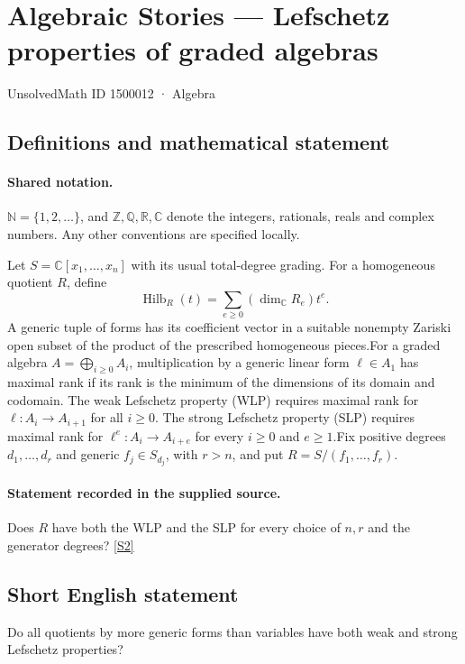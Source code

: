 \documentclass[11pt]{article}
\newcommand{\sref}[2]{\hyperlink{source:#1:#2}{[S#2]}}
\begin{document}
\setcounter{section}{1500011}
\section{Algebraic Stories — Lefschetz properties of graded algebras}\label{1500012}
{\small\sffamily UnsolvedMath ID 1500012 · Algebra}
\subsection{Definitions and mathematical statement}

\paragraph{Shared notation.}$\mathbb N=\{1,2,\ldots\}$, and $\mathbb Z,\mathbb Q,\mathbb R,\mathbb C$ denote the integers, rationals, reals and complex numbers. Any other conventions are specified locally.


Let $S=\mathbb C[x_1,\ldots,x_n]$ with its usual total-degree grading. For a homogeneous quotient $R$, define
\[\operatorname{Hilb}_R(t)=\sum_{e\geq0}(\dim_{\mathbb C}R_e)t^e.
\]
A generic tuple of forms has its coefficient vector in a suitable nonempty Zariski open subset of the product of the prescribed homogeneous pieces.For a graded algebra $A=\bigoplus_{i\geq0}A_i$, multiplication by a generic linear form $\ell\in A_1$ has maximal rank if its rank is the minimum of the dimensions of its domain and codomain. The weak Lefschetz property (WLP) requires maximal rank for $\ell:A_i\to A_{i+1}$ for all $i\geq0$. The strong Lefschetz property (SLP) requires maximal rank for $\ell^e:A_i\to A_{i+e}$ for every $i\geq0$ and $e\geq1$.Fix positive degrees $d_1,\ldots,d_r$ and generic $f_j\in S_{d_j}$, with $r>n$, and put $R=S/(f_1,\ldots,f_r)$.
\paragraph{Statement recorded in the supplied source.}
Does $R$ have both the WLP and the SLP for every choice of $n,r$ and the generator degrees? \sref{1500012}{2}
\subsection{Short English statement}
Do all quotients by more generic forms than variables have both weak and strong Lefschetz properties?
\end{document}
